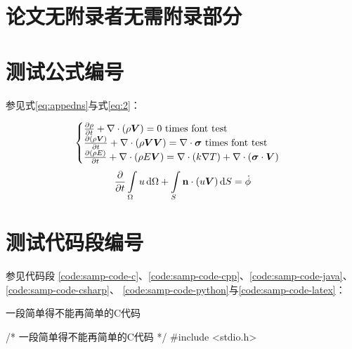 \begin{appendices}\label{sec:appendices}

	\section*{论文无附录者无需附录部分}

	\section*{测试公式编号} \label{sec:testmath}

	参见式\eqref{eq:appedns}与式\eqref{eq:2}：

	\begin{equation} \label{eq:appedns}
		\begin{cases}
			\frac{\partial \rho}{\partial t} + \nabla\cdot(\rho\Vector{V}) = 0 \ \mathrm{times\ font\ test}                                            \\
			\frac{\partial (\rho\Vector{V})}{\partial t} + \nabla\cdot(\rho\Vector{V}\Vector{V}) = \nabla\cdot\Tensor{\sigma} \ \text{times font test} \\
			\frac{\partial (\rho E)}{\partial t} + \nabla\cdot(\rho E\Vector{V}) = \nabla\cdot(k\nabla T) + \nabla\cdot(\Tensor{\sigma}\cdot\Vector{V})
		\end{cases}
	\end{equation}
	\begin{equation} \label{eq:2}
		\frac{\partial }{\partial t}\int\limits_{\Omega} u \, \mathrm{d}\Omega + \int\limits_{S} \boldsymbol{\mathbf{n}}\cdot(u\boldsymbol{V}) \, \mathrm{d}S = \dot{\phi}
	\end{equation}

	\section*{测试代码段编号} \label{sec:testlistings}

	参见代码段
	\ref{code:samp-code-c}、\ref{code:samp-code-cpp}、\ref{code:samp-code-java}、\ref{code:samp-code-csharp}、
	\ref{code:samp-code-python}与\ref{code:samp-code-latex}：

    \begin{listing}[H]
        \centering
        \caption{一段简单得不能再简单的C代码}
        \label{code:samp-code-c}
        \begin{ccode}
            /* 一段简单得不能再简单的C代码 */
            #include <stdio.h>


\end{ccode}
\end{listing}
\end{appendices}
